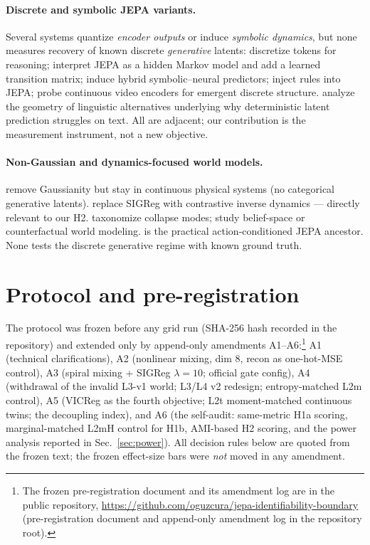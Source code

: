 \documentclass[11pt]{article}
\begin{document}
\paragraph{Discrete and symbolic JEPA variants.}
Several systems quantize \emph{encoder outputs} or induce \emph{symbolic
dynamics}, but none measures recovery of known discrete \emph{generative}
latents: \citet{discretejepa2025} discretize tokens for reasoning;
\citet{mcjepa2026} interpret JEPA as a hidden Markov model and add a learned
transition matrix; \citet{sjepa2026} induce hybrid symbolic--neural predictors;
\citet{rijepa2026} inject rules into JEPA; \citet{aimprobing2026} probe
continuous video encoders for emergent discrete structure. \citet{jepaparadox2026}
analyze the geometry of linguistic alternatives underlying why deterministic
latent prediction struggles on text. All are adjacent;
our contribution is the measurement instrument, not a new objective.

\paragraph{Non-Gaussian and dynamics-focused world models.}
\citet{arya2026} remove Gaussianity but stay in continuous physical systems
(no categorical generative latents). \citet{nogaussian2026} replace SIGReg with
contrastive inverse dynamics --- directly relevant to our H2. \citet{phylatent2026}
taxonomize collapse modes; \citet{uwmjepa2026b,causaljepa2026,dsge2026} study
belief-space or counterfactual world modeling. \citet{leworldmodel2026} is the
practical action-conditioned JEPA ancestor. None tests the discrete generative
regime with known ground truth.

\section{Protocol and pre-registration}
\label{sec:protocol}
The protocol was frozen before any
grid run (SHA-256 hash recorded in the repository) and extended only by
append-only amendments A1--A6:\footnote{The frozen pre-registration document
and its amendment log are in the public repository,
\url{https://github.com/oguzcura/jepa-identifiability-boundary}
(pre-registration document and append-only amendment log in the
repository root).}
A1 (technical clarifications), A2 (nonlinear mixing, dim 8, recon as
one-hot-MSE control), A3 (spiral mixing + SIGReg $\lambda{=}10$; official gate
config), A4 (withdrawal of the invalid L3-v1 world; L3/L4 v2 redesign;
entropy-matched L2m control), A5 (VICReg as the fourth objective; L2t
moment-matched continuous twins; the decoupling index), and A6 (the self-audit:
same-metric H1a scoring, marginal-matched L2mH control for H1b, AMI-based H2
scoring, and the power analysis reported in Sec.~\ref{sec:power}).
All decision rules below are quoted from the frozen text; the frozen
effect-size bars were \emph{not} moved in any amendment.
\end{document}
